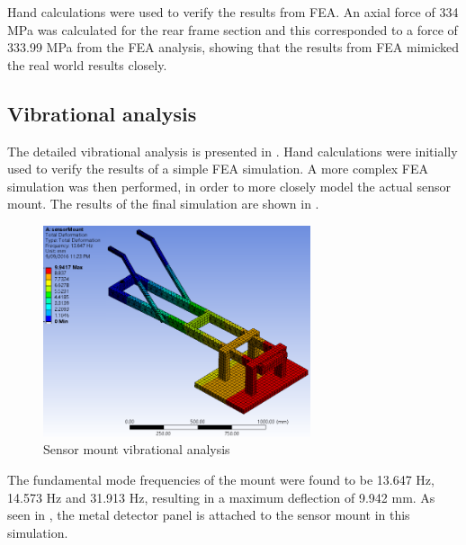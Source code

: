 \documentclass[main.tex]{subfiles}
\begin{document}
Hand calculations were used to verify the results from FEA. An axial force of 334 MPa was calculated for the rear frame section and this corresponded to a force of 333.99 MPa from the FEA analysis, showing that the results from FEA mimicked the real world results closely. 

\subsection{Vibrational analysis}
The detailed vibrational analysis is presented in . Hand calculations were initially used to verify the results of a simple FEA simulation. A more complex FEA simulation was then performed, in order to more closely model the actual sensor mount. The results of the final simulation are shown in . 

\begin{figure}[ht]
\includegraphics[width=0.7\textwidth]{4-DetailedDesign/vibrations.PNG}
\centering
\caption{Sensor mount vibrational analysis} 
\end{figure} 

The fundamental mode frequencies of the mount were found to be 13.647 Hz, 14.573 Hz and 31.913 Hz, resulting in a maximum deflection of 9.942 mm. As seen in , the metal detector panel is attached to the sensor mount in this simulation. 
\end{document}
